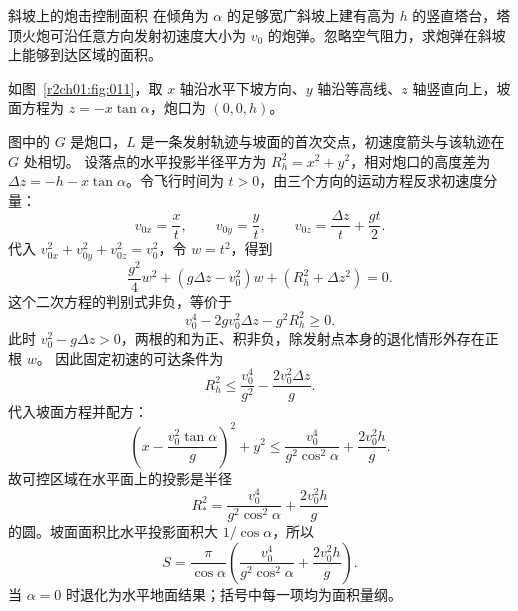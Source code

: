 \begin{practicebox}{斜坡上的炮击控制面积}
在倾角为 $\alpha$ 的足够宽广斜坡上建有高为 $h$ 的竖直塔台，塔顶火炮可沿任意方向发射初速度大小为 $v_0$ 的炮弹。忽略空气阻力，求炮弹在斜坡上能够到达区域的面积。
\label{r2ch01:pr:002}
\begin{solution}
如图~\ref{r2ch01:fig:011}，取 $x$ 轴沿水平下坡方向、$y$ 轴沿等高线、$z$ 轴竖直向上，坡面方程为 $z=-x\tan\alpha$，炮口为 $(0,0,h)$。

\figSlopeRange

图中的 $G$ 是炮口，$L$ 是一条发射轨迹与坡面的首次交点，初速度箭头与该轨迹在 $G$ 处相切。
设落点的水平投影半径平方为 $R_h^2=x^2+y^2$，相对炮口的高度差为
$\Delta z=-h-x\tan\alpha$。令飞行时间为 $t>0$，由三个方向的运动方程反求初速度分量：
\[
 v_{0x}=\frac{x}{t},\qquad v_{0y}=\frac{y}{t},\qquad
 v_{0z}=\frac{\Delta z}{t}+\frac{gt}{2}.
\]
代入 $v_{0x}^2+v_{0y}^2+v_{0z}^2=v_0^2$，令 $w=t^2$，得到
\[
 \frac{g^2}{4}w^2+(g\Delta z-v_0^2)w+(R_h^2+\Delta z^2)=0.
\]
这个二次方程的判别式非负，等价于
\[
 v_0^4-2gv_0^2\Delta z-g^2R_h^2\geq0.
\]
此时 $v_0^2-g\Delta z>0$，两根的和为正、积非负，除发射点本身的退化情形外存在正根 $w$。
因此固定初速的可达条件为
\[
  R_h^2\leq \frac{v_0^4}{g^2}-\frac{2v_0^2\Delta z}{g}.
\]
代入坡面方程并配方：
\[
  \left(x-\frac{v_0^2\tan\alpha}{g}\right)^2+y^2
  \leq \frac{v_0^4}{g^2\cos^2\alpha}+\frac{2v_0^2h}{g}.
\]
故可控区域在水平面上的投影是半径
\[
  R_*^2=\frac{v_0^4}{g^2\cos^2\alpha}+\frac{2v_0^2h}{g}
\]
的圆。坡面面积比水平投影面积大 $1/\cos\alpha$，所以
\[
  \boxed{S=\frac{\pi}{\cos\alpha}
  \left(\frac{v_0^4}{g^2\cos^2\alpha}+\frac{2v_0^2h}{g}\right)}.
\]
当 $\alpha=0$ 时退化为水平地面结果；括号中每一项均为面积量纲。
\end{solution}
\end{practicebox}

